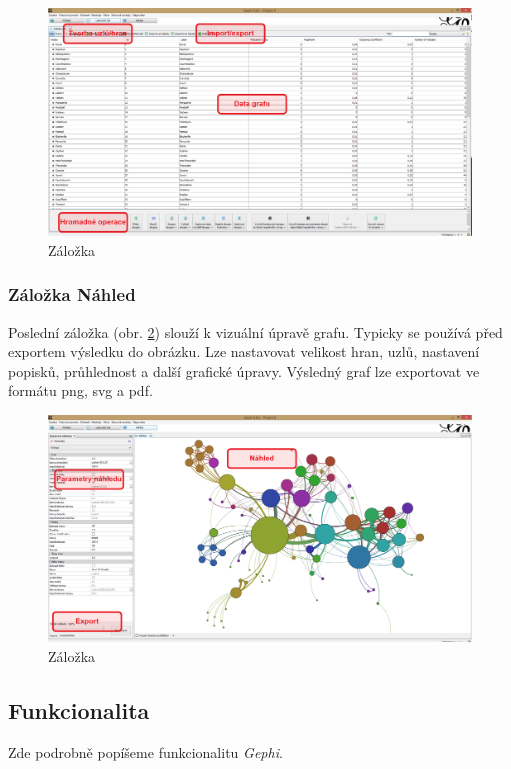 \documentclass[thesis=M,czech]{FITthesis}[2014/05/6]
\begin{document}
\begin{figure}\centering
 	\includegraphics[width=1\textwidth]{images/gephi/gephi_lab_final}
 	\caption[Záložka ]{Záložka }\label{fig:gephi-lab}
\end{figure}

\subsubsection{Záložka Náhled}
Poslední záložka (obr. \ref{fig:gephi-exp}) slouží k vizuální úpravě grafu. Typicky se používá před exportem výsledku do obrázku. Lze nastavovat velikost hran, uzlů, nastavení popisků, průhlednost a další grafické úpravy.
Výsledný graf lze exportovat ve formátu png, svg a pdf.

\begin{figure}\centering
 	\includegraphics[width=1\textwidth]{images/gephi/gephi_exp_final}
 	\caption[Záložka ]{Záložka }\label{fig:gephi-exp}
\end{figure}

\subsection{Funkcionalita}
Zde podrobně popíšeme funkcionalitu \textit{Gephi}.
\end{document}
